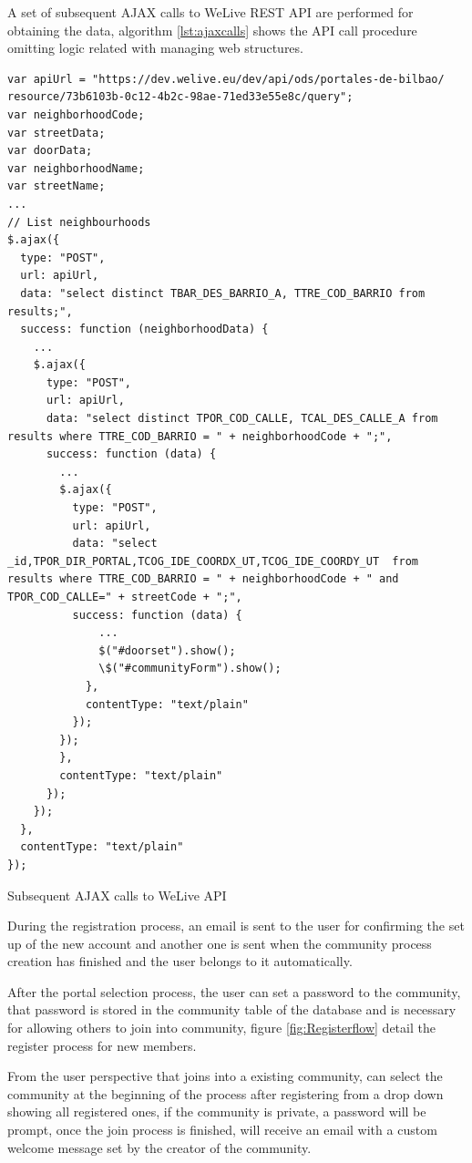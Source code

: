 \documentclass{DeustoFDP}
\begin{document}
A set of subsequent AJAX calls to WeLive REST API are performed for obtaining the data, algorithm \ref{lst:ajaxcalls} shows the API call procedure omitting logic related with managing web structures.

\begin{listing}[!h]\centering 
	\begin{minipage}{.9\textwidth}
		\begin{verbatim}
var apiUrl = "https://dev.welive.eu/dev/api/ods/portales-de-bilbao/
resource/73b6103b-0c12-4b2c-98ae-71ed33e55e8c/query";
var neighborhoodCode;
var streetData;
var doorData;
var neighborhoodName;
var streetName;
...
// List neighbourhoods
$.ajax({
  type: "POST",
  url: apiUrl,
  data: "select distinct TBAR_DES_BARRIO_A, TTRE_COD_BARRIO from results;",
  success: function (neighborhoodData) {
    ...
    $.ajax({
      type: "POST",
      url: apiUrl,
      data: "select distinct TPOR_COD_CALLE, TCAL_DES_CALLE_A from results where TTRE_COD_BARRIO = " + neighborhoodCode + ";",
      success: function (data) {
        ...
        $.ajax({
          type: "POST",
          url: apiUrl,
          data: "select _id,TPOR_DIR_PORTAL,TCOG_IDE_COORDX_UT,TCOG_IDE_COORDY_UT  from results where TTRE_COD_BARRIO = " + neighborhoodCode + " and TPOR_COD_CALLE=" + streetCode + ";",
          success: function (data) {
              ...
              $("#doorset").show();
              \$("#communityForm").show();
            },
            contentType: "text/plain"
          });
        });
        },
        contentType: "text/plain"
      });
    });
  },
  contentType: "text/plain"
});
		\end{verbatim}
	\end{minipage}
	\caption{Subsequent AJAX calls to WeLive API }\label{lst:ajaxcalls}
\end{listing}

During the registration process, an email is sent to the user for confirming the set up of the new account and another one is sent when the community process creation has finished and the user belongs to it automatically.

After the portal selection process, the user can set a password to the community, that password is stored in the community table of the database and is necessary for allowing others to join into community, figure \ref{fig:Registerflow} detail the register process for new members.

From the user perspective that joins into a existing community, can select the community at the beginning of the process after registering from a drop down showing all registered ones, if the community is private, a password will be prompt, once the join process is finished, will receive an email with a custom welcome message set by the creator of the community.
\end{document}
